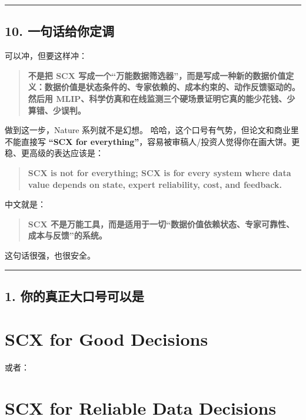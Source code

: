 \documentclass[
  12pt,
]{ctexart}
\begin{document}
\begin{center}\rule{0.5\linewidth}{0.5pt}\end{center}

\subsection{10.
一句话给你定调}\label{ux4e00ux53e5ux8bddux7ed9ux4f60ux5b9aux8c03}

可以冲，但要这样冲：

\begin{quote}
\textbf{不是把 SCX
写成一个``万能数据筛选器''，而是写成一种新的数据价值定义：数据价值是状态条件的、专家依赖的、成本约束的、动作反馈驱动的。然后用
MLIP、科学仿真和在线监测三个硬场景证明它真的能少花钱、少算错、少误判。}
\end{quote}

做到这一步，Nature 系列就不是幻想。
哈哈，这个口号有气势，但论文和商业里不能直接写 \textbf{``SCX for
everything''}，容易被审稿人/投资人觉得你在画大饼。更稳、更高级的表达应该是：

\begin{quote}
\textbf{SCX is not for everything; SCX is for every system where data
value depends on state, expert reliability, cost, and feedback.}
\end{quote}

中文就是：

\begin{quote}
\textbf{SCX
不是万能工具，而是适用于一切``数据价值依赖状态、专家可靠性、成本与反馈''的系统。}
\end{quote}

这句话很强，也很安全。

\begin{center}\rule{0.5\linewidth}{0.5pt}\end{center}

\subsection{1.
你的真正大口号可以是}\label{ux4f60ux7684ux771fux6b63ux5927ux53e3ux53f7ux53efux4ee5ux662f}

\section{\texorpdfstring{\textbf{SCX for Good
Decisions}}{SCX for Good Decisions}}\label{scx-for-good-decisions}

或者：

\section{\texorpdfstring{\textbf{SCX for Reliable Data
Decisions}}{SCX for Reliable Data Decisions}}\label{scx-for-reliable-data-decisions}
\end{document}
